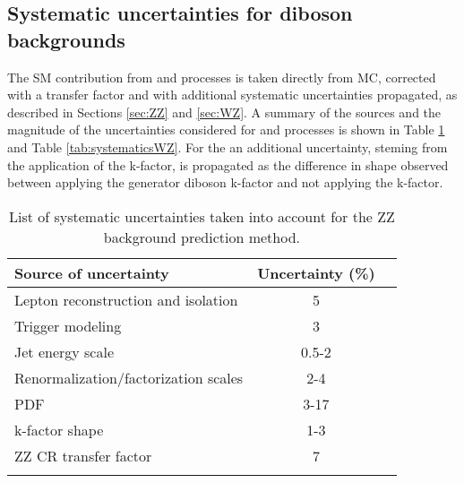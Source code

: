 \subsection*{Systematic uncertainties for diboson backgrounds}
\noindent
\justify
The SM contribution from \PWZ and \PZZ processes is taken directly from MC, corrected with a transfer factor and with additional systematic uncertainties propagated, as described in Sections \ref{sec:ZZ} and \ref{sec:WZ}.
A summary of the sources and the magnitude of the uncertainties considered for \PZZ and \PWZ processes is shown in Table \ref{tab:systematicsZZ} and Table \ref{tab:systematicsWZ}.
For the \PZZ an additional uncertainty, steming from the application of the k-factor, is propagated as the difference in shape observed between applying the generator diboson \pt k-factor and not applying the k-factor.
\begin{table}[!hbtp]
\renewcommand{\arraystretch}{1.2}
\setlength{\belowcaptionskip}{6pt}
\small
\centering
\caption{
List of systematic uncertainties taken into account for the ZZ background prediction method.}
\begin{tabular}{l c c}
\hline\hline
Source of uncertainty                         & Uncertainty (\%)     \\
\hline
Lepton reconstruction and isolation     &      {5}                   \\ %
Trigger modeling                        &      {3}                   \\ %
Jet energy scale                        &      {0.5-2}                  \\ %
Renormalization/factorization scales    &      {2-4}                 \\ %
PDF                                     &      {3-17}                 \\ %
k-factor shape                          &      {1-3}                 \\ %
ZZ CR transfer factor             &      {7}                 \\ %
\hline\hline
\label{tab:systematicsZZ}
\end{tabular}
\end{table}
